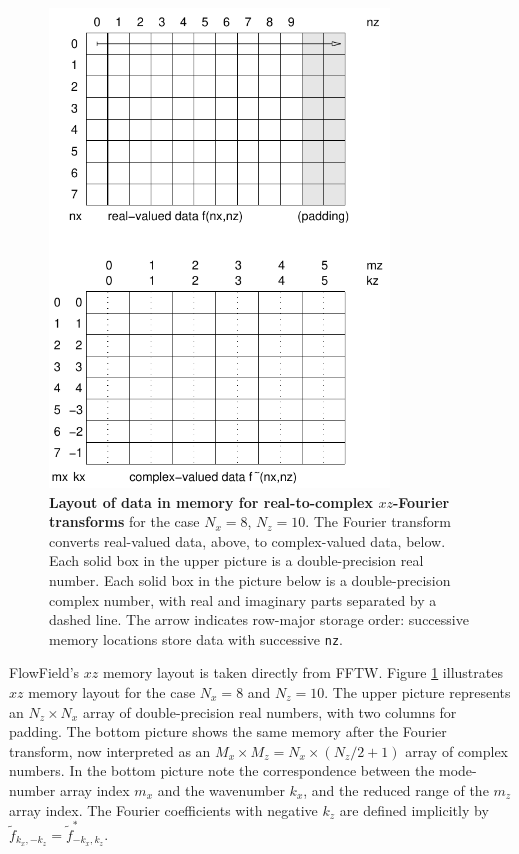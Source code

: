 \documentclass{article}[12pt]
\begin{document}
\begin{figure}
\begin{center}
\includegraphics[height=5.0in]{datalayout}
\end{center}
\caption{{\bf Layout of data in memory for real-to-complex $xz$-Fourier transforms}
for the case $N_x = 8$, $N_z = 10$. The Fourier transform converts real-valued
data, above, to complex-valued data, below. Each solid box in the upper picture
is a double-precision real number. Each solid box in the picture below is a
double-precision complex number, with real and imaginary parts separated by a
dashed line. The arrow indicates row-major storage order: successive memory
locations store data with successive {\tt nz}.}
\label{fig:datalayout}
\end{figure}

FlowField's $xz$ memory layout is taken directly from FFTW. Figure
\ref{fig:datalayout} illustrates $xz$ memory layout for the case
$N_x=8$ and $N_z=10$. The upper picture represents an $N_z \times N_x$
array of double-precision real numbers, with two columns for padding.
The bottom picture shows the same memory after the Fourier transform,
now interpreted as an $M_x \times M_z = N_x \times (N_z/2+1)$ array of
complex numbers. In the bottom picture note the correspondence between
the mode-number array index $m_x$ and the wavenumber $k_x$, and the
reduced range of the $m_z$ array index. The Fourier coefficients with
negative $k_z$ are defined implicitly by $\widetilde{f}_{k_x, -k_z} =
\widetilde{f}_{-k_x, k_z}^*$.
\end{document}
